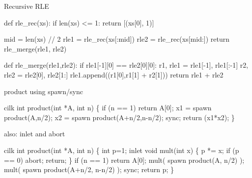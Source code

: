 \documentclass[13pt]{beamer}
\begin{document}
\begin{frame}[fragile]{Recursive RLE}
\begin{semiverbatim}
def rle_rec(xs):
    if len(xs) <= 1:
        return [(xs[0], 1)]

    mid = len(xs) // 2
    rle1 = \onslide*<2->{\alert{spawn} }rle_rec(xs[:mid])
    rle2 = rle_rec(xs[mid:])
    return rle_merge(rle1, rle2)

def rle_merge(rle1,rle2):
    if rle1[-1][0] == rle2[0][0]:
        r1, rle1 = rle1[-1], rle1[:-1]
        r2, rle2 = rle2[0], rle2[1:]
        rle1.append((r1[0],r1[1] + r2[1]))
    return rle1 + rle2
\end{semiverbatim}

\end{frame}

\begin{frame}[fragile]{product using {\ttfamily spawn}/{\ttfamily sync}}{}
\begin{semiverbatim}
{\color{red3}cilk} int product(int *A, int n) \{
  if (n == 1)
    return A[0];
  x1 = {\color{red3}spawn} product(A,n/2);
  x2 = {\color{red3}spawn} product(A+n/2,n-n/2);
  {\color{red3}sync};
  return (x1*x2);
\}
\end{semiverbatim}
\end{frame}

\begin{frame}[fragile]{also: {\ttfamily inlet} and {\ttfamily abort}}{}
\begin{semiverbatim}
cilk int product(int *A, int n) \{
    int p=1;
    {\color{red3}inlet} void mult(int x) \{
        p *= x;
        if (p == 0)
             {\color{red3}abort;}
        return;
    \}
    if (n == 1)
         return A[0];
    mult( spawn product(A, n/2) );
    mult( spawn product(A+n/2, n-n/2) );
    sync;
    return p;
\}
\end{semiverbatim}
\end{frame}
\end{document}
